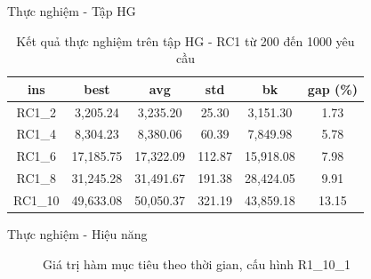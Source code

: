 \begin{frame}{Thực nghiệm - Tập HG}
  \begin{table}
    \begin{tabular}{cccccc}
      \hline
      ins & best & avg & std & bk & gap (\%) \\ \hline
      RC1\_2 & 3,205.24	& 3,235.20 & 25.30 & 3,151.30	& 1.73 \\ \hline
      RC1\_4 & 8,304.23 & 8,380.06	& 60.39	& 7,849.98 & 5.78 \\ \hline
      RC1\_6 & 17,185.75 & 17,322.09 & 112.87 & 15,918.08	& 7.98 \\ \hline
      RC1\_8 & 31,245.28 & 31,491.67 & 191.38 & 28,424.05	&	9.91 \\ \hline
      RC1\_10 & 49,633.08	& 50,050.37	& 321.19 & 43,859.18 & 13.15 \\ \hline
    \end{tabular}
    \caption{Kết quả thực nghiệm trên tập HG - RC1 từ 200 đến 1000 yêu cầu}
  \end{table}
\end{frame}


\begin{frame}{Thực nghiệm - Hiệu năng}
  \begin{figure}
    \centering
    \quad
  \caption{Giá trị hàm mục tiêu theo thời gian, cấu hình R1\_10\_1}
  \end{figure}
\end{frame}

